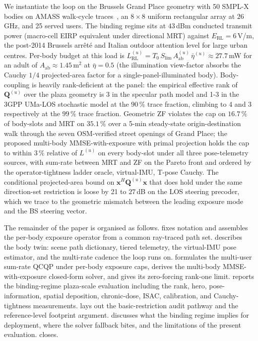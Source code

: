 \documentclass[journal,twocolumn,10pt]{IEEEtran}
\theoremstyle{plain}
\theoremstyle{remark}
\newcommand{\xx}{\mathbf{x}}
\newcommand{\Aab}{A_{\mathrm{ab}}}
\newcommand{\Qmat}{\mathbf{Q}}
\begin{document}
We instantiate the loop on the Brussels Grand Place geometry with
50 SMPL-X bodies on AMASS walk-cycle traces~\cite{SMPL,SMPLX,AMASS},
an $8\times 8$ uniform rectangular array at $26\,$GHz, and 25 served
users. The binding regime sits at $43\,$dBm conducted transmit power
(macro-cell EIRP equivalent under directional MRT) against
$E_{\mathrm{RL}} = 6\,$V/m, the post-2014 Brussels arr\^et\'e and
Italian outdoor attention level for large urban centres. Per-body
budget at this load is $L^{(u)}_{\mathrm{RL}} =
T_0\,S_{\mathrm{lim}}\,\Aab^{(u)}\,\bar\eta^{(u)} \approx
27.7\,$mW for an adult of $\Aab \approx 1.45\,$m$^2$ at
$\bar\eta = 0.5$ (the illumination view-factor absorbs the Cauchy
$1/4$ projected-area factor for a single-panel-illuminated body). Body-coupling is heavily rank-deficient at the
panel: the empirical effective rank of $\Qmat^{(u)}$ over the
plaza geometry is 3 in the specular path model and 1-3 in the
3GPP UMa-LOS stochastic model at the $90\,\%$ trace fraction,
climbing to 4 and 3 respectively at the $99\,\%$ trace fraction.
Geometric ZF violates the cap on $16.7\,\%$ of body-slots and MRT
on $35.1\,\%$ over a 5-min steady-state origin-destination walk
through the seven OSM-verified street openings of Grand Place; the
proposed multi-body MMSE-with-exposure with primal projection
holds the cap to within $3\,\%$ relative of $L^{(u)}$ on every
body-slot under all three pose-telemetry sources, with sum-rate
between MRT and ZF on the Pareto front and ordered by the
operator-tightness ladder oracle, virtual-IMU, T-pose Cauchy.
The conditional projected-area bound on $\xx^H \Qmat^{(u)} \xx$
that does hold under the same direction-set restriction is loose by
21 to $27\,$dB on the LOS steering precoder, which we trace to the
geometric mismatch between the leading exposure mode and the BS
steering vector.

The remainder of the paper is organised as follows.
 fixes notation and assembles the per-body exposure
operator from a common ray-traced path set.  describes
the body twin: scene path dictionary, tiered telemetry,
the virtual-IMU pose estimator, and the multi-rate cadence the loop
runs on.  formulates the multi-user sum-rate
QCQP under per-body exposure caps, derives the multi-body MMSE-with-exposure closed-form
solver, and gives its zero-forcing rank-one limit.
 reports the binding-regime plaza-scale evaluation
including the rank, hero, pose-information, spatial deposition,
chronic-dose, ISAC, calibration, and Cauchy-tightness measurements.
 lays out the basic-restriction audit pathway
and the reference-level footprint argument. 
discusses what the binding regime implies for deployment, where the
solver fallback bites, and the limitations of the present
evaluation.  closes.
\end{document}
